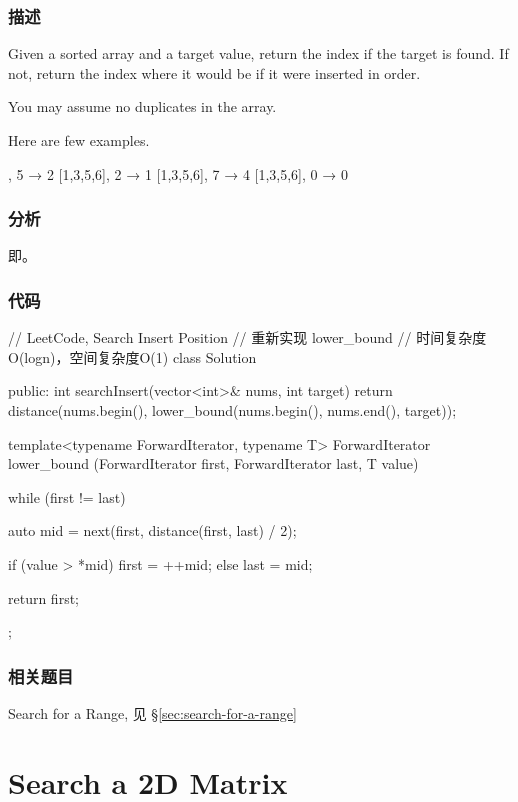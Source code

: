 \subsubsection{描述}
Given a sorted array and a target value, return the index if the target is found. If not, return the index where it would be if it were inserted in order.

You may assume no duplicates in the array.

Here are few examples.
\begin{Code}
[1,3,5,6], 5 → 2
[1,3,5,6], 2 → 1
[1,3,5,6], 7 → 4
[1,3,5,6], 0 → 0
\end{Code}


\subsubsection{分析}
即。


\subsubsection{代码}
\begin{Code}
// LeetCode, Search Insert Position
// 重新实现 lower_bound
// 时间复杂度O(logn)，空间复杂度O(1)
class Solution {
public:
    int searchInsert(vector<int>& nums, int target) {
        return distance(nums.begin(), lower_bound(nums.begin(), nums.end(), target));
    }

    template<typename ForwardIterator, typename T>
    ForwardIterator lower_bound (ForwardIterator first,
            ForwardIterator last, T value) {
        while (first != last) {
            auto mid = next(first, distance(first, last) / 2);

            if (value > *mid)   first = ++mid;
            else                last = mid;
        }

        return first;
    }
};
\end{Code}


\subsubsection{相关题目}
\begindot
\item Search for a Range, 见 \S \ref{sec:search-for-a-range}
\myenddot


\section{Search a 2D Matrix} %
\label{sec:search-a-2d-matrix}



